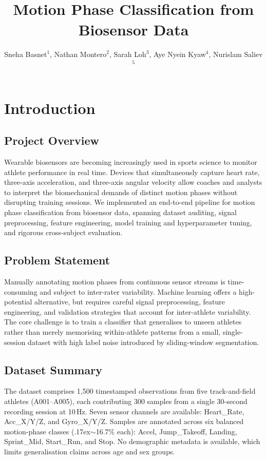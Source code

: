 \documentclass[12pt,a4paper]{cibb}
\title{\Large $\ $\\ \bf Motion Phase Classification from Biosensor Data}
\author{\blue \large Sneha Basnet$^1$, Nathan Montero$^2$, Sarah Loh$^3$, Aye Nyein Kyaw$^4$, Nurislam Saliev$^5$}
\begin{document}
\renewcommand{\thefootnote}{}

\thispagestyle{myheadings}
\pagestyle{myheadings}

\section{Introduction}
\label{sec:introduction}

\subsection{Project Overview}
Wearable biosensors are becoming increasingly used in sports science to monitor athlete performance in real time. Devices that simultaneously capture heart rate, three-axis acceleration, and three-axis angular velocity allow coaches and analysts to interpret the biomechanical demands of distinct motion phases without disrupting training sessions. We implemented an end-to-end pipeline for motion phase classification from biosensor data, spanning dataset auditing, signal preprocessing, feature engineering, model training and hyperparameter tuning, and rigorous cross-subject evaluation.

\subsection{Problem Statement}
Manually annotating motion phases from continuous sensor streams is time-consuming and subject to inter-rater variability. Machine learning offers a high-potential alternative, but requires careful signal preprocessing, feature engineering, and validation strategies that account for inter-athlete variability. The core challenge is to train a classifier that generalises to unseen athletes rather than merely memorising within-athlete patterns from a small, single-session dataset with high label noise introduced by sliding-window segmentation.

\subsection{Dataset Summary}
The dataset comprises 1{,}500 timestamped observations from five track-and-field athletes (A001--A005), each contributing 300 samples from a single 30-second recording session at 10\,Hz. Seven sensor channels are available: Heart\_Rate, Acc\_X/Y/Z, and Gyro\_X/Y/Z. Samples are annotated across six balanced motion-phase classes ({\raise.17ex\hbox{$\scriptstyle\sim$}}16.7\% each): Accel, Jump\_Takeoff, Landing, Sprint\_Mid, Start\_Run, and Stop. No demographic metadata is available, which limits generalisation claims across age and sex groups.
\end{document}
